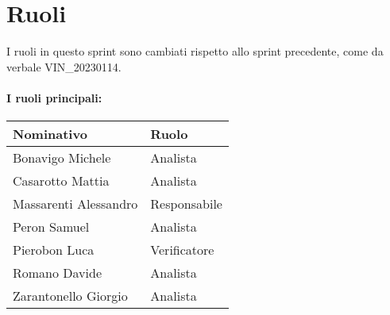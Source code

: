 \section{Ruoli}

I ruoli in questo sprint sono cambiati rispetto allo sprint precedente, come da verbale VIN\_20230114.
\paragraph{I ruoli principali:}

\begin{center}
    \begin{tabularx}{\textwidth}{X l}
        
        \rowcolor{gray!30} \textbf{Nominativo} & \textbf{Ruolo}\\
        
        \hline

        Bonavigo Michele & Analista \\
        \rowcolor{gray!10}Casarotto Mattia & Analista \\
        Massarenti Alessandro & Responsabile \\
        \rowcolor{gray!10}Peron Samuel & Analista \\
        Pierobon Luca & Verificatore \\
        \rowcolor{gray!10}Romano Davide & Analista \\
        Zarantonello Giorgio & Analista \\

    \end{tabularx}
\end{center}
